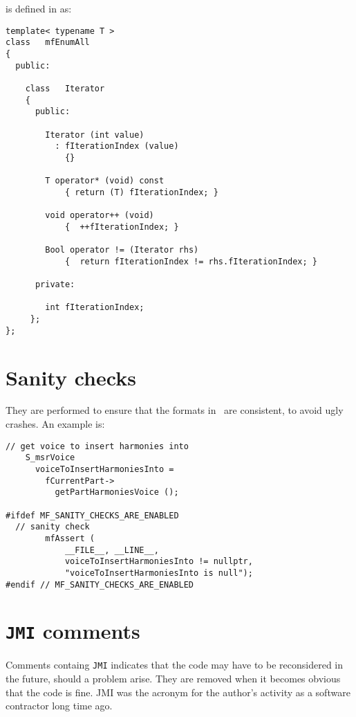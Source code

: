 \newpage

 is defined in  as:
\begin{lstlisting}[language=CPlusPlus]
template< typename T >
class   mfEnumAll
{
  public:

    class   Iterator
    {
      public:

        Iterator (int value)
          : fIterationIndex (value)
            {}

        T operator* (void) const
            { return (T) fIterationIndex; }

        void operator++ (void)
            {  ++fIterationIndex; }

        Bool operator != (Iterator rhs)
            {  return fIterationIndex != rhs.fIterationIndex; }

      private:

        int fIterationIndex;
     };
};
\end{lstlisting}


\section{Sanity checks}

They are performed to ensure that the formats in \mf\ are consistent, to avoid ugly crashes. An example is:
\begin{lstlisting}[language=CPlusPlus]
    // get voice to insert harmonies into
    S_msrVoice
      voiceToInsertHarmoniesInto =
        fCurrentPart->
          getPartHarmoniesVoice ();

#ifdef MF_SANITY_CHECKS_ARE_ENABLED
  // sanity check
		mfAssert (
			__FILE__, __LINE__,
			voiceToInsertHarmoniesInto != nullptr,
			"voiceToInsertHarmoniesInto is null");
#endif // MF_SANITY_CHECKS_ARE_ENABLED
\end{lstlisting}


\section{{\tt JMI} comments}

Comments containg {\tt JMI} indicates that the code may have to be reconsidered in the future, should a problem arise. They are removed when it becomes obvious that the code is fine. JMI was the acronym for the author's activity as a software contractor long time ago.


